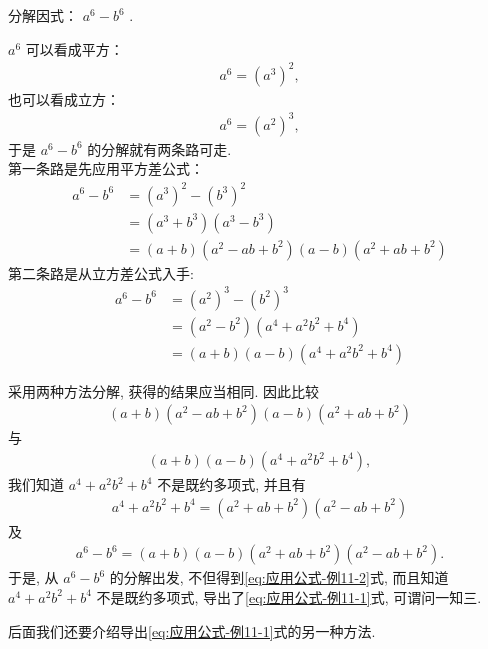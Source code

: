\begin{example}
	分解因式： $a^{6}-b^{6}$ .
\end{example}
\begin{solution}
	$a^{6}$ 可以看成平方：
	\begin{align*}
		a^{6}=\left(a^{3}\right)^{2},
	\end{align*}
	也可以看成立方：
	\begin{align*}
		a^{6}=\left(a^{2}\right)^{3},
	\end{align*}
	于是 $a^{6}-b^{6}$ 的分解就有两条路可走. \\
	第一条路是先应用平方差公式：
	\begin{align*}
		a^{6}-b^{6} & = \left(a^{3}\right)^{2}-\left(b^{3}\right)^{2}                      \\
		            & = \left(a^{3}+b^{3}\right)\left(a^{3}-b^{3}\right)                   \\
		            & = (a+b)\left(a^{2}-a b+b^{2}\right)(a-b)\left(a^{2}+a b+b^{2}\right)
	\end{align*}
	第二条路是从立方差公式入手:
	\begin{align*}
		a^{6}-b^{6} & = \left(a^{2}\right)^{3}-\left(b^{2}\right)^{3}                \\
		            & = \left(a^{2}-b^{2}\right)\left(a^{4}+a^{2} b^{2}+b^{4}\right) \\
		            & = (a+b)(a-b)\left(a^{4}+a^{2} b^{2}+b^{4}\right)
	\end{align*}
\end{solution}
\begin{note}
	采用两种方法分解, 获得的结果应当相同. 因此比较
	\begin{align*}
		(a+b)\left(a^{2}-a b+b^{2}\right)(a-b)\left(a^{2}+a b+b^{2}\right)
	\end{align*}
	与
	\begin{align*}
		(a+b)(a-b)\left(a^{4}+a^{2} b^{2}+b^{4}\right),
	\end{align*}
	我们知道 $a^{4}+a^{2} b^{2}+b^{4}$ 不是既约多项式, 并且有
	\begin{align}\label{eq:应用公式-例11-1}
		a^{4}+a^{2} b^{2}+b^{4}=\left(a^{2}+a b+b^{2}\right)\left(a^{2}-a b+b^{2}\right)
	\end{align}
	及
	\begin{align}\label{eq:应用公式-例11-2}
		a^{6}-b^{6}=(a+b)(a-b)\left(a^{2}+a b+b^{2}\right)\left(a^{2}-a b+b^{2}\right) .
	\end{align}
	于是, 从 $a^{6}-b^{6}$ 的分解出发, 不但得到\ref{eq:应用公式-例11-2}式, 而且知道 $a^{4}+a^{2} b^{2}+b^{4}$ 不是既约多项式, 导出了\ref{eq:应用公式-例11-1}式, 可谓问一知三.

	后面我们还要介绍导出\ref{eq:应用公式-例11-1}式的另一种方法.
\end{note}

